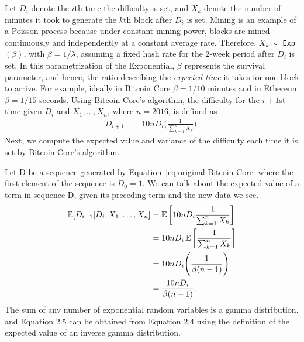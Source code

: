 Let $D_i$ denote the $i$th time the difficulty is set, and $X_k$ denote the number of minutes it took to generate the $k$th block after $D_i$ is set. 
Mining is an example of a Poisson process because under constant
mining power, blocks are mined continuously and independently at a
constant average rate.  Therefore, $X_k \sim$ \texttt{Exp}$(\beta)$, with $\beta = 1/\lambda$, assuming a fixed hash rate for the 2-week period after $D_i$ is set. In this parametrization of the Exponential, $\beta$ represents the survival parameter, and hence, the ratio describing the {\em expected time} it takes for one block to arrive. For example, ideally in Bitcoin Core $\beta=1/10$ minutes and in Ethereum $\beta=1/15$ seconds. Using Bitcoin Core's algorithm, the difficulty for the $i+1$st time given $D_i$ and $X_1, \dots, X_n$, where $n=2016$, is defined as
\begin{align}
D_{i+1} &= 10nD_i \Bigg(\frac{1}{\sum_{k=1}^{n} X_k}\Bigg).\label{eq:original-Bitcoin Core}
\end{align}
Next, we compute the expected value and variance of the difficulty each time it is set by Bitcoin Core's algorithm.

Let D be a sequence generated by Equation~\ref{eq:original-Bitcoin Core} where the first element of the sequence is $D_0 = 1$. We can talk about the expected value of a term in sequence D, given its preceding term and the new data we see. 
\begin{align}
\operatorname{\mathbb{E}}[D_{i+1} | D_{i}, X_1, \dots, X_{n}] &= \operatorname{\mathbb{E}}\bigg[10n D_i \frac{1}{\sum_{k=1}^{n} X_k}\bigg] \\
&= 10n D_i \operatorname{\mathbb{E}}\bigg[\frac{1}{\sum_{k=1}^{n} X_k}\bigg] \\
&= 10n D_i \Bigg(\frac{1}{\beta(n-1)}\Bigg) \\
&= \frac{10n D_i}{\beta(n-1)}.
\end{align}
The sum of any number of exponential random variables is a gamma distribution, and Equation 2.5 can be obtained from Equation 2.4 using the definition of the expected value of an inverse gamma distribution.


